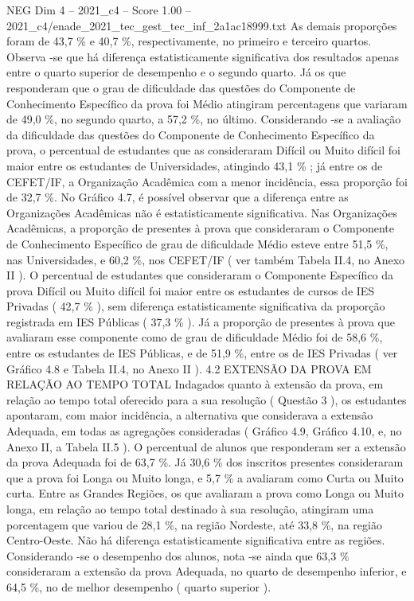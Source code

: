 \begin{textsample}{NEG Dim 4 – 2021\_c4 – Score 1.00 – 2021\_c4/enade\_2021\_tec\_gest\_tec\_inf\_2a1ac18999.txt}
As demais proporções foram de 43,7 \% e 40,7 \%, respectivamente, no primeiro e terceiro quartos.
Observa -se que há diferença estatisticamente significativa dos resultados apenas entre o quarto superior de desempenho e o segundo quarto.
Já os que responderam que o grau de dificuldade das questões do Componente de Conhecimento Específico da prova foi Médio atingiram percentagens que variaram de 49,0 \%, no segundo quarto, a 57,2 \%, no último.
Considerando -se a avaliação da dificuldade das questões do Componente de Conhecimento Específico da prova, o percentual de estudantes que as consideraram Difícil ou Muito difícil foi maior entre os estudantes de Universidades, atingindo 43,1 \% ; já entre os de CEFET/IF, a Organização Acadêmica com a menor incidência, essa proporção foi de 32,7 \%.
No Gráfico 4.7, é possível observar que a diferença entre as Organizações Acadêmicas não é estatisticamente significativa.
Nas Organizações Acadêmicas, a proporção de presentes à prova que consideraram o Componente de Conhecimento Específico de grau de dificuldade Médio esteve entre 51,5 \%, nas Universidades, e 60,2 \%, nos CEFET/IF ( ver também Tabela II.4, no Anexo II ).
O percentual de estudantes que consideraram o Componente Específico da prova Difícil ou Muito difícil foi maior entre os estudantes de cursos de IES Privadas ( 42,7 \% ), sem diferença estatisticamente significativa da proporção registrada em IES Públicas ( 37,3 \% ).
Já a proporção de presentes à prova que avaliaram esse componente como de grau de dificuldade Médio foi de 58,6 \%, entre os estudantes de IES Públicas, e de 51,9 \%, entre os de IES Privadas ( ver Gráfico 4.8 e Tabela II.4, no Anexo II ). 4.2 EXTENSÃO DA PROVA EM RELAÇÃO AO TEMPO TOTAL Indagados quanto à extensão da prova, em relação ao tempo total oferecido para a sua resolução ( Questão 3 ), os estudantes apontaram, com maior incidência, a alternativa que considerava a extensão Adequada, em todas as agregações consideradas ( Gráfico 4.9, Gráfico 4.10, e, no Anexo II, a Tabela II.5 ).
O percentual de alunos que responderam ser a extensão da prova Adequada foi de 63,7 \%.
Já 30,6 \% dos inscritos presentes consideraram que a prova foi Longa ou Muito longa, e 5,7 \% a avaliaram como Curta ou Muito curta.
Entre as Grandes Regiões, os que avaliaram a prova como Longa ou Muito longa, em relação ao tempo total destinado à sua resolução, atingiram uma porcentagem que variou de 28,1 \%, na região Nordeste, até 33,8 \%, na região Centro-Oeste.
Não há diferença estatisticamente significativa entre as regiões.
Considerando -se o desempenho dos alunos, nota -se ainda que 63,3 \% consideraram a extensão da prova Adequada, no quarto de desempenho inferior, e 64,5 \%, no de melhor desempenho ( quarto superior ).

\end{textsample}
